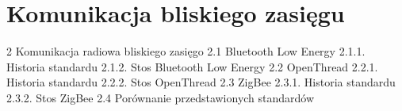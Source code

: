 \section{Komunikacja bliskiego zasięgu}

2 Komunikacja radiowa bliskiego zasięgo
 2.1 Bluetooth Low Energy
  2.1.1. Historia standardu
  2.1.2. Stos Bluetooth Low Energy
 2.2 OpenThread
  2.2.1. Historia standardu
  2.2.2. Stos OpenThread
 2.3 ZigBee
  2.3.1. Historia standardu
  2.3.2. Stos ZigBee
 2.4 Porównanie przedstawionych standardów

